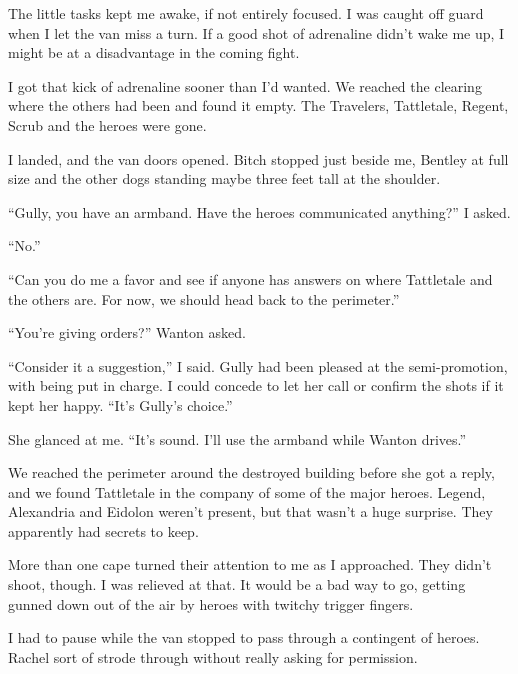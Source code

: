 The little tasks kept me awake, if not entirely focused. I was caught off guard when I let the van miss a turn.  If a good shot of adrenaline didn't wake me up, I might be at a disadvantage in the coming fight.



I got that kick of adrenaline sooner than I'd wanted.  We reached the clearing where the others had been and found it empty.  The Travelers, Tattletale, Regent, Scrub and the heroes were gone.



I landed, and the van doors opened.  Bitch stopped just beside me, Bentley at full size and the other dogs standing maybe three feet tall at the shoulder.



``Gully, you have an armband.  Have the heroes communicated anything?''  I asked.



``No.''



``Can you do me a favor and see if anyone has answers on where Tattletale and the others are.  For now, we should head back to the perimeter.''



``You're giving orders?'' Wanton asked.



``Consider it a suggestion,'' I said.  Gully had been pleased at the semi-promotion, with being put in charge.  I could concede to let her call or confirm the shots if it kept her happy.  ``It's Gully's choice.''



She glanced at me.  ``It's sound.  I'll use the armband while Wanton drives.''



We reached the perimeter around the destroyed building before she got a reply, and we found Tattletale in the company of some of the major heroes.  Legend, Alexandria and Eidolon weren't present, but that wasn't a huge surprise.  They apparently had secrets to keep.



More than one cape turned their attention to me as I approached.  They didn't shoot, though.  I was relieved at that.  It would be a bad way to go, getting gunned down out of the air by heroes with twitchy trigger fingers.



I had to pause while the van stopped to pass through a contingent of heroes.  Rachel sort of strode through without really asking for permission.



